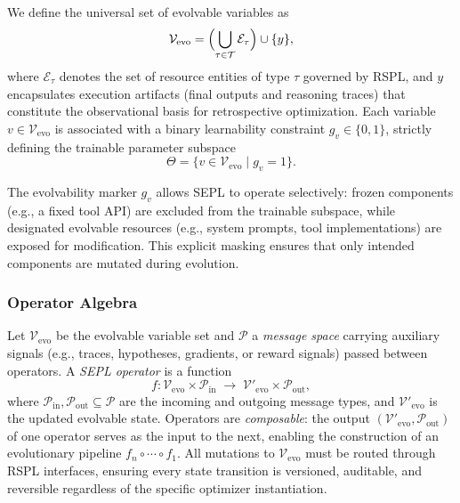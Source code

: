\begin{definition}
We define the universal set of evolvable variables as
\begin{equation}
\mathcal{V}_{\text{evo}} = \Bigl(\bigcup_{\tau \in \mathcal{T}} \mathcal{E}_{\tau}\Bigr) \cup \{y\},
\end{equation}
where $\mathcal{E}_{\tau}$ denotes the set of resource entities of type $\tau$ governed by RSPL, and $y$ encapsulates execution artifacts (final outputs and reasoning traces) that constitute the observational basis for retrospective optimization. Each variable $v \in \mathcal{V}_{\text{evo}}$ is associated with a binary learnability constraint $g_{v} \in \{0,1\}$, strictly defining the trainable parameter subspace
\begin{equation}
\Theta = \{v \in \mathcal{V}_{\text{evo}} \mid g_{v}=1\}.
\end{equation}
\end{definition}

The evolvability marker $g_v$ allows SEPL to operate selectively: frozen components (e.g., a fixed tool API) are excluded from the trainable subspace, while designated evolvable resources (e.g., system prompts, tool implementations) are exposed for modification. This explicit masking ensures that only intended components are mutated during evolution.

\subsubsection{Operator Algebra}

\begin{definition}
\label{appx_def:sepl-operator}
Let $\mathcal{V}_{\text{evo}}$ be the evolvable variable set and $\mathcal{P}$ a \emph{message space} carrying auxiliary signals (e.g., traces, hypotheses, gradients, or reward signals) passed between operators. A \emph{SEPL operator} is a function
\begin{equation}
f: \mathcal{V}_{\text{evo}} \times \mathcal{P}_{\text{in}} \;\rightarrow\; \mathcal{V}'_{\text{evo}} \times \mathcal{P}_{\text{out}},
\end{equation}
where $\mathcal{P}_{\text{in}}, \mathcal{P}_{\text{out}} \subseteq \mathcal{P}$ are the incoming and outgoing message types, and $\mathcal{V}'_{\text{evo}}$ is the updated evolvable state. Operators are \emph{composable}: the output $(\mathcal{V}'_{\text{evo}}, \mathcal{P}_{\text{out}})$ of one operator serves as the input to the next, enabling the construction of an evolutionary pipeline $f_n \circ \cdots \circ f_1$. All mutations to $\mathcal{V}_{\text{evo}}$ must be routed through RSPL interfaces, ensuring every state transition is versioned, auditable, and reversible regardless of the specific optimizer instantiation.
\end{definition}

